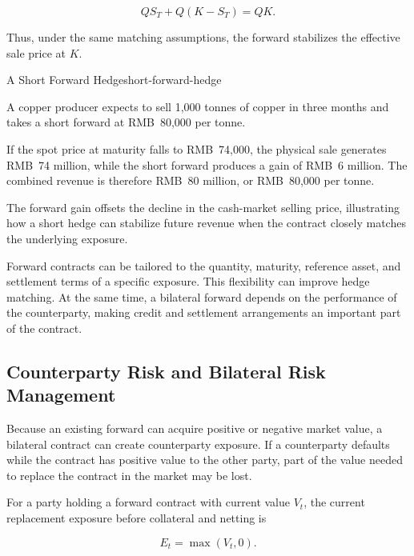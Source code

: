 \begin{equation*}
QS_T+Q(K-S_T)=QK.
\label{eq:ch17-perfect-short-forward-hedge}
\end{equation*}

Thus, under the same matching assumptions, the forward stabilizes the effective sale price at $K$.

\begin{example}{A Short Forward Hedge}{short-forward-hedge}

A copper producer expects to sell 1,000 tonnes of copper in three months and takes a short forward at RMB~80,000 per tonne.

If the spot price at maturity falls to RMB~74,000, the physical sale generates RMB~74 million, while the short forward produces a gain of RMB~6 million. The combined revenue is therefore RMB~80 million, or RMB~80,000 per tonne.

The forward gain offsets the decline in the cash-market selling price, illustrating how a short hedge can stabilize future revenue when the contract closely matches the underlying exposure.

\end{example}

Forward contracts can be tailored to the quantity, maturity, reference asset, and settlement terms of a specific exposure. This flexibility can improve hedge matching. At the same time, a bilateral forward depends on the performance of the counterparty, making credit and settlement arrangements an important part of the contract.

\subsection{Counterparty Risk and Bilateral Risk Management}

Because an existing forward can acquire positive or negative market value, a bilateral contract can create counterparty exposure. If a counterparty defaults while the contract has positive value to the other party, part of the value needed to replace the contract in the market may be lost.

For a party holding a forward contract with current value
$V_t$, the current replacement exposure before collateral
and netting is

\begin{equation}
E_t=\max(V_t,0).
\label{eq:ch17-forward-current-exposure}
\end{equation}

